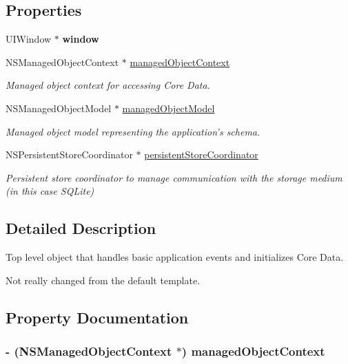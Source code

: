 \subsection*{Properties}
\begin{DoxyCompactItemize}
\item 
\hypertarget{interface_p_c_app_delegate_a92e958d020e612899454ed0a062ebe73}{
UIWindow $\ast$ {\bfseries window}}
\label{interface_p_c_app_delegate_a92e958d020e612899454ed0a062ebe73}

\item 
NSManagedObjectContext $\ast$ \hyperlink{interface_p_c_app_delegate_a980f45923c9d2eb3fa671e92dd204e3f}{managedObjectContext}
\begin{DoxyCompactList}\small\item\em Managed object context for accessing Core Data. \end{DoxyCompactList}\item 
NSManagedObjectModel $\ast$ \hyperlink{interface_p_c_app_delegate_acf3035b95e2a03cabab1d92ff2831b7c}{managedObjectModel}
\begin{DoxyCompactList}\small\item\em Managed object model representing the application's schema. \end{DoxyCompactList}\item 
NSPersistentStoreCoordinator $\ast$ \hyperlink{interface_p_c_app_delegate_aef8aefeba1dc9c793c031314d2cec738}{persistentStoreCoordinator}
\begin{DoxyCompactList}\small\item\em Persistent store coordinator to manage communication with the storage medium (in this case SQLite) \end{DoxyCompactList}\end{DoxyCompactItemize}


\subsection{Detailed Description}
Top level object that handles basic application events and initializes Core Data. 

Not really changed from the default template. 

\subsection{Property Documentation}
\hypertarget{interface_p_c_app_delegate_a980f45923c9d2eb3fa671e92dd204e3f}{
\subsubsection[{managedObjectContext}]{\setlength{\rightskip}{0pt plus 5cm}-\/ (NSManagedObjectContext $\ast$) managedObjectContext}}
\label{interface_p_c_app_delegate_a980f45923c9d2eb3fa671e92dd204e3f}


